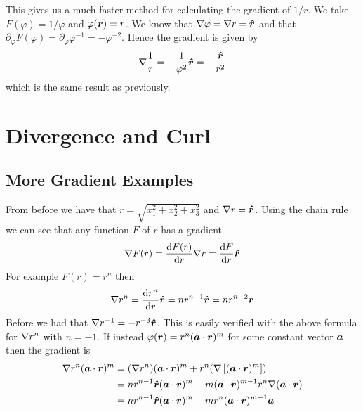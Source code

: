 \documentclass{article}
\begin{document}
    \example
    This gives us a much faster method for calculating the gradient of \(1/r\).
    We take \(F(\varphi) = 1/\varphi\) and \(\varphi(\bm{r}) = r\).
    We know that \(\nabla\varphi = \nabla r = \bm{\hat{r}}\) and that \(\partial_\varphi F(\varphi) = \partial_\varphi \varphi^{-1} = -\varphi^{-2}\).
    Hence the gradient is given by
    \[\nabla\frac{1}{r} = -\frac{1}{\varphi^2}\bm{\hat{r}} = -\frac{\bm{\hat{r}}}{r^2}\]
    which is the same result as previously.
    
    \section{Divergence and Curl}
    \subsection{More Gradient Examples}
    From before we have that \(r = \sqrt{x_1^2 + x_2^2 + x_3^2}\) and \(\nabla r = \bm{\hat{r}}\).
    Using the chain rule we can see that any function \(F\) of \(r\) has a gradient
    \[\nabla F(r) = \dv{F(r)}{r}\nabla r = \dv{F}{r}\bm{\hat{r}}\]
    For example \(F(r) = r^n\) then
    \[\nabla r^n = \dv{r^n}{r}\bm{\hat{r}} = nr^{n - 1}\bm{\hat{r}} = nr^{n - 2}\bm{r}\]
    Before we had that \(\nabla r^{-1} = -r^{-3}\bm{\hat{r}}\).
    This is easily verified with the above formula for \(\nabla r^n\) with \(n = -1\).
    If instead \(\varphi(\bm{r}) = r^n(\bm{a}\cdot\bm{r})^m\) for some constant vector \(\bm{a}\) then the gradient is
    \begin{align*}
        \nabla r^n(\bm{a}\cdot\bm{r})^m &= (\nabla r^n)(\bm{a}\cdot\bm{r})^m + r^n(\nabla \left[(\bm{a}\cdot\bm{r})^m\right])\\
        &= nr^{n - 1}\bm{\hat{r}}(\bm{a}\cdot\bm{r})^m + m(\bm{a}\cdot\bm{r})^{m - 1}r^n\nabla (\bm{a}\cdot\bm{r})\\
        &= nr^{n - 1}\bm{\hat{r}}(\bm{a}\cdot\bm{r})^m + mr^n(\bm{a}\cdot\bm{r})^{m - 1}\bm{a}
    \end{align*}
    
\end{document}
